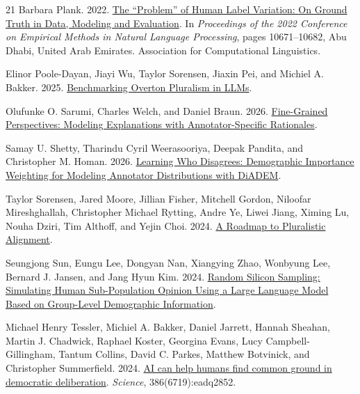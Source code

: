 \documentclass[11pt,a4paper]{article}
\begin{document}
\begin{thebibliography}{21}
Barbara Plank. 2022. \href{https://doi.org/10.18653/v1/2022.emnlp-main.731}{The ``Problem'' of Human Label Variation: On Ground Truth in Data, Modeling and Evaluation}. In \emph{Proceedings of the 2022 Conference on Empirical Methods in Natural Language Processing}, pages 10671--10682, Abu Dhabi, United Arab Emirates. Association for Computational Linguistics.

Elinor Poole-Dayan, Jiayi Wu, Taylor Sorensen, Jiaxin Pei, and Michiel A. Bakker. 2025. \href{https://doi.org/10.48550/ARXIV.2512.01351}{Benchmarking Overton Pluralism in LLMs}.

Olufunke O. Sarumi, Charles Welch, and Daniel Braun. 2026. \href{https://doi.org/10.48550/ARXIV.2604.21667}{Fine-Grained Perspectives: Modeling Explanations with Annotator-Specific Rationales}.

Samay U. Shetty, Tharindu Cyril Weerasooriya, Deepak Pandita, and Christopher M. Homan. 2026. \href{https://doi.org/10.48550/ARXIV.2604.08425}{Learning Who Disagrees: Demographic Importance Weighting for Modeling Annotator Distributions with DiADEM}.

Taylor Sorensen, Jared Moore, Jillian Fisher, Mitchell Gordon, Niloofar Mireshghallah, Christopher Michael Rytting, Andre Ye, Liwei Jiang, Ximing Lu, Nouha Dziri, Tim Althoff, and Yejin Choi. 2024. \href{https://doi.org/10.48550/ARXIV.2402.05070}{A Roadmap to Pluralistic Alignment}.

Seungjong Sun, Eungu Lee, Dongyan Nan, Xiangying Zhao, Wonbyung Lee, Bernard J. Jansen, and Jang Hyun Kim. 2024. \href{https://doi.org/10.48550/ARXIV.2402.18144}{Random Silicon Sampling: Simulating Human Sub-Population Opinion Using a Large Language Model Based on Group-Level Demographic Information}.

Michael Henry Tessler, Michiel A. Bakker, Daniel Jarrett, Hannah Sheahan, Martin J. Chadwick, Raphael Koster, Georgina Evans, Lucy Campbell-Gillingham, Tantum Collins, David C. Parkes, Matthew Botvinick, and Christopher Summerfield. 2024. \href{https://doi.org/10.1126/science.adq2852}{AI can help humans find common ground in democratic deliberation}. \emph{Science}, 386(6719):eadq2852.


\end{thebibliography}
\end{document}
